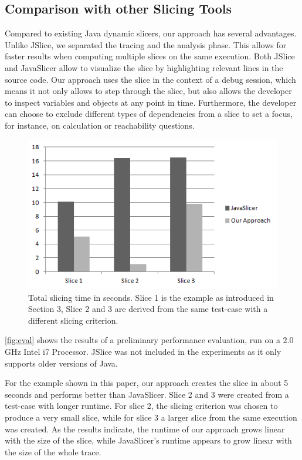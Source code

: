 \documentclass[english]{scrartcl}
\begin{document}
\subsection{Comparison with other Slicing Tools}


Compared to existing Java dynamic slicers, our approach has several advantages.
Unlike JSlice, we separated the tracing and the analysis phase.
This allows for faster results when computing multiple slices on the same execution.
Both JSlice and JavaSlicer allow to visualize the slice by highlighting relevant lines in the source code.
Our approach uses the slice in the context of a debug session, which means it not only allows to step through the slice, but also allows the developer to inspect variables and objects at any point in time.
Furthermore, the developer can choose to exclude different types of dependencies from a slice to set a focus, for instance, on calculation or reachability questions.

\begin{figure}
\centering
\includegraphics[width=.9\linewidth]{img/eval}
\caption{Total slicing time in seconds. Slice 1 is the example as introduced in Section 3, Slice 2 and 3 are derived from the same test-case with a different slicing criterion.}
\label{fig:eval}
\end{figure}

\autoref{fig:eval} shows the results of a preliminary performance evaluation, run on a 2.0 GHz Intel i7 Processor.
JSlice was not included in the experiments as it only supports older versions of Java.

For the example shown in this paper, our approach creates the slice in about 5 seconds and performs better than JavaSlicer.
Slice 2 and 3 were created from a test-case with longer runtime. 
For slice 2, the slicing criterion was chosen to produce a very small slice, while for slice 3 a larger slice from the same execution was created.
As the results indicate, the runtime of our approach grows linear with the size of the slice, while JavaSlicer's runtime appears to grow linear with the size of the whole trace.
\end{document}
